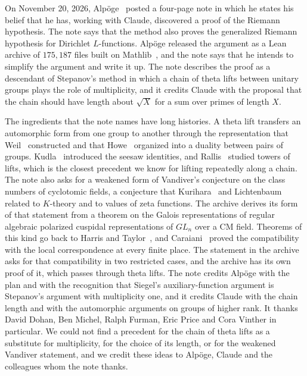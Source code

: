 \documentclass[11pt,letterpaper]{article}
\numberwithin{equation}{section}
\begin{document}
On November 20, 2026, Alp\"oge~\cite{note} posted a four-page note in which he states his belief that he has, working with Claude, discovered a proof of the Riemann hypothesis. The note says that the method also proves the generalized Riemann hypothesis for Dirichlet $L$-functions. Alp\"oge released the argument as a Lean~\cite{lean4} archive of $175{,}187$ files built on Mathlib~\cite{mathlib}, and the note says that he intends to simplify the argument and write it up. The note describes the proof as a descendant of Stepanov's method in which a chain of theta lifts between unitary groups plays the role of multiplicity, and it credits Claude with the proposal that the chain should have length about $\sqrt X$ for a sum over primes of length $X$.

The ingredients that the note names have long histories. A theta lift transfers an automorphic form from one group to another through the representation that Weil~\cite{weil64} constructed and that Howe~\cite{howe} organized into a duality between pairs of groups. Kudla~\cite{kudla} introduced the seesaw identities, and Rallis~\cite{rallis} studied towers of lifts, which is the closest precedent we know for lifting repeatedly along a chain. The note also asks for a weakened form of Vandiver's conjecture on the class numbers of cyclotomic fields, a conjecture that Kurihara~\cite{kurihara} and Lichtenbaum~\cite{lichtenbaum} related to $K$-theory and to values of zeta functions. The archive derives its form of that statement from a theorem on the Galois representations of regular algebraic polarized cuspidal representations of $GL_n$ over a CM field. Theorems of this kind go back to Harris and Taylor~\cite{harristaylor}, and Caraiani~\cite{caraiani} proved the compatibility with the local correspondence at every finite place. The statement in the archive asks for that compatibility in two restricted cases, and the archive has its own proof of it, which passes through theta lifts. The note credits Alp\"oge with the plan and with the recognition that Siegel's auxiliary-function argument is Stepanov's argument with multiplicity one, and it credits Claude with the chain length and with the automorphic arguments on groups of higher rank. It thanks David Dohan, Ben Michel, Ralph Furman, Eric Price and Cora Vinther in particular. We could not find a precedent for the chain of theta lifts as a substitute for multiplicity, for the choice of its length, or for the weakened Vandiver statement, and we credit these ideas to Alp\"oge, Claude and the colleagues whom the note thanks.
\end{document}
